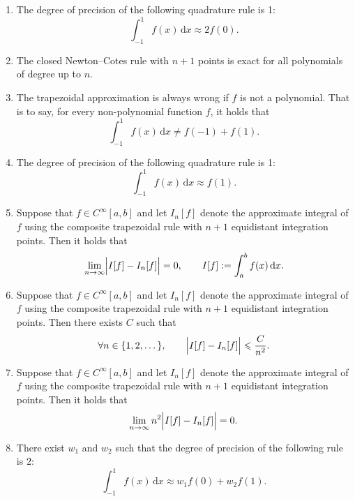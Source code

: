 \documentclass[a4paper]{article}
\renewcommand{\d}{\mathrm d}
\begin{document}
\begin{enumerate}

    \item
        The degree of precision of the following quadrature rule is 1:
        \[
            \int_{-1}^{1} f(x) \, \d x
            \approx 2 f(0).
        \]

    \item
        The closed Newton--Cotes rule with $n+1$ points is exact for all polynomials of degree up to $n$.

    \item
        The trapezoidal approximation is always wrong if $f$ is not a polynomial.
        That is to say, for every non-polynomial function $f$, it holds that
        \[
            \int_{-1}^1 f(x) \, \d x \neq f(-1) + f(1).
        \]

    \item
        The degree of precision of the following quadrature rule is 1:
        \[
            \int_{-1}^1 f(x) \, \d x \approx f(1).
        \]

    \item
        Suppose that $f \in C^{\infty}[a, b]$ and let $I_n[f]$ denote the approximate integral of $f$ using the composite trapezoidal rule
        with $n+1$ equidistant integration points.
        Then it holds that
        \[
            \lim_{n \to \infty} \Bigl\lvert I[f] - I_n[f] \Bigr\rvert = 0, \qquad I[f] := \int_{a}^{b} f(x) \, \d x.
        \]

    \item
        Suppose that $f \in C^{\infty}[a, b]$ and let $I_n[f]$ denote the approximate integral of $f$ using the composite trapezoidal rule
        with $n+1$ equidistant integration points.
        Then there exists $C$ such that
        \[
             \forall n \in \{1, 2, \dotsc \}, \qquad
             \Bigl\lvert I[f] - I_n[f] \Bigr\rvert \leq \frac{C}{n^2}.
        \]

    \item
        Suppose that $f \in C^{\infty}[a, b]$ and let $I_n[f]$ denote the approximate integral of $f$ using the composite trapezoidal rule
        with $n+1$ equidistant integration points.
        Then it holds that
        \[
             \lim_{n \to \infty} n^2 \Bigl\lvert I[f] - I_n[f] \Bigr\rvert = 0.
        \]

    \item
        There exist $w_1$ and $w_2$ such that the degree of precision of the following rule is $2$:
        \[
            \int_{-1}^1 f(x) \, \d x \approx w_1 f(0) + w_2 f(1).
        \]


\end{enumerate}
\end{document}
